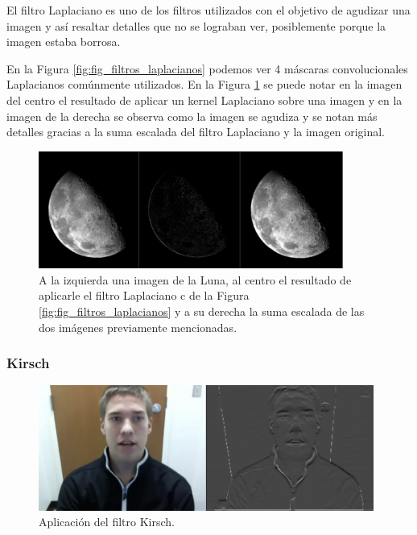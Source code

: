 \begin{onehalfspacing}
El filtro Laplaciano es uno de los filtros utilizados con el objetivo de agudizar una imagen y así resaltar detalles que no se lograban ver, posiblemente porque la imagen estaba borrosa.

En la Figura \ref{fig:fig_filtros_laplacianos} podemos ver 4 máscaras convolucionales Laplacianos comúnmente utilizados. En la Figura \ref{fig:Fig_Ejemplo_Laplaciano} se puede notar en la imagen del centro el resultado de aplicar un kernel Laplaciano sobre una imagen y en la imagen de la derecha se observa como la imagen se agudiza y se notan más detalles gracias a la suma escalada del filtro Laplaciano y la imagen original.

\begin{figure}[th]
	\centering
	\includegraphics[width=10cm,keepaspectratio]{XX_Figures/Fig_Ejemplo_Laplaciano.png}
	\caption{\footnotesize A la izquierda una imagen de la Luna, al centro el resultado de aplicarle el filtro Laplaciano c de la Figura \ref{fig:fig_filtros_laplacianos} y a su derecha la suma escalada de las dos imágenes previamente mencionadas.}
	\label{fig:Fig_Ejemplo_Laplaciano}
\end{figure}

\subsubsection{Kirsch}
\label{Kirsch}

\begin{figure}[th]
	\centering
	\includegraphics[width=11cm,keepaspectratio]{XX_Figures/Fig_Ejemplo_Kirsch.png}
	\caption{\footnotesize Aplicación del filtro Kirsch.}
	\label{fig:Fig_Ejemplo_Kirsch}
\end{figure}


\end{onehalfspacing}

